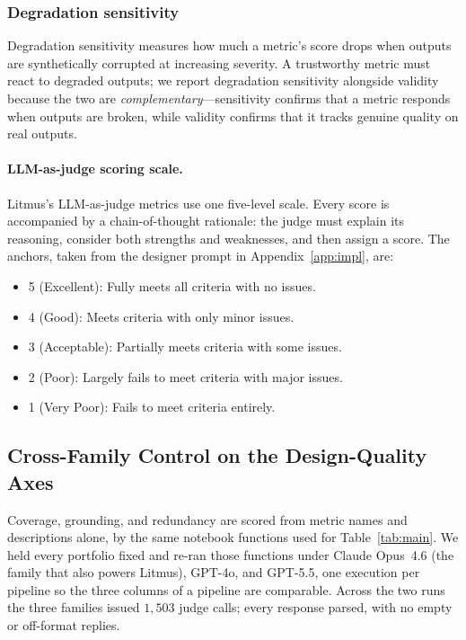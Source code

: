 \documentclass[11pt]{article}
\begin{document}
\subsubsection{Degradation sensitivity}

Degradation sensitivity measures how much a metric's score drops when outputs are synthetically corrupted at increasing severity. A trustworthy metric must react to degraded outputs; we report degradation sensitivity alongside validity because the two are \emph{complementary}---sensitivity confirms that a metric responds when outputs are broken, while validity confirms that it tracks genuine quality on real outputs.

\paragraph{LLM-as-judge scoring scale.}
Litmus's LLM-as-judge metrics use one five-level scale. Every score is accompanied by a chain-of-thought rationale: the judge must explain its reasoning, consider both strengths and weaknesses, and then assign a score. The anchors, taken from the designer prompt in Appendix~\ref{app:impl}, are:
\begin{itemize}
  \item 5 (Excellent): Fully meets all criteria with no issues.
  \item 4 (Good): Meets criteria with only minor issues.
  \item 3 (Acceptable): Partially meets criteria with some issues.
  \item 2 (Poor): Largely fails to meet criteria with major issues.
  \item 1 (Very Poor): Fails to meet criteria entirely.
\end{itemize}

\subsection{Cross-Family Control on the Design-Quality Axes}
\label{app:axescontrol}

Coverage, grounding, and redundancy are scored from metric names and descriptions alone, by the same notebook functions used for Table~\ref{tab:main}. We held every portfolio fixed and re-ran those functions under Claude Opus~4.6 (the family that also powers Litmus), GPT-4o, and GPT-5.5, one execution per pipeline so the three columns of a pipeline are comparable. Across the two runs the three families issued $1{,}503$ judge calls; every response parsed, with no empty or off-format replies.
\end{document}
